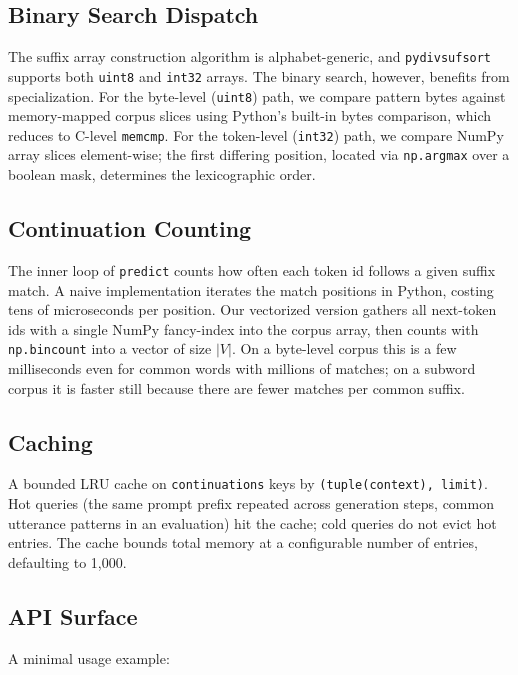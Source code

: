 \documentclass[11pt]{article}
\begin{document}
\subsection{Binary Search Dispatch}

The suffix array construction algorithm is alphabet-generic, and \texttt{pydivsufsort} supports both \texttt{uint8} and \texttt{int32} arrays. The binary search, however, benefits from specialization. For the byte-level (\texttt{uint8}) path, we compare pattern bytes against memory-mapped corpus slices using Python's built-in bytes comparison, which reduces to C-level \texttt{memcmp}. For the token-level (\texttt{int32}) path, we compare NumPy array slices element-wise; the first differing position, located via \texttt{np.argmax} over a boolean mask, determines the lexicographic order.

\subsection{Continuation Counting}

The inner loop of \texttt{predict} counts how often each token id follows a given suffix match. A naive implementation iterates the match positions in Python, costing tens of microseconds per position. Our vectorized version gathers all next-token ids with a single NumPy fancy-index into the corpus array, then counts with \texttt{np.bincount} into a vector of size $|V|$. On a byte-level corpus this is a few milliseconds even for common words with millions of matches; on a subword corpus it is faster still because there are fewer matches per common suffix.

\subsection{Caching}

A bounded LRU cache on \texttt{continuations} keys by \texttt{(tuple(context), limit)}. Hot queries (the same prompt prefix repeated across generation steps, common utterance patterns in an evaluation) hit the cache; cold queries do not evict hot entries. The cache bounds total memory at a configurable number of entries, defaulting to 1{,}000.

\subsection{API Surface}

A minimal usage example:
\end{document}

